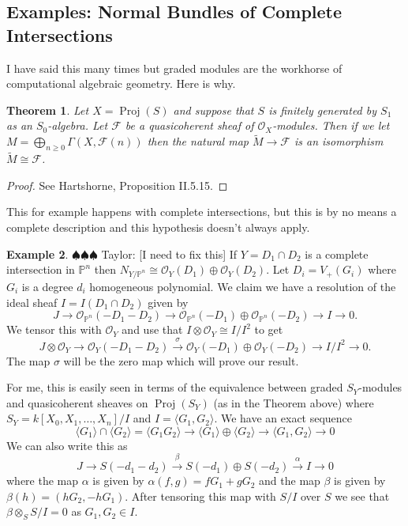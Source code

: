 \documentclass[12pt]{article}
\numberwithin{equation}{section}
\newtheorem{theorem}{Theorem}[subsection]
\theoremstyle{definition}
\newtheorem{example}[theorem]{Example}
\theoremstyle{remark}
\newcommand{\Ocal}{\mathcal{O}}
\newcommand{\PP}{\mathbb{P}}
\newcommand{\Proj}{\operatorname{Proj}}
\newcommand{\Fcal}{\mathcal{F}}
\newcommand{\taylor}[1]{{\color{blue} \sf $\spadesuit\spadesuit\spadesuit$ Taylor: [#1]}}
\begin{document}
\subsection{Examples: Normal Bundles of Complete Intersections}
I have said this many times but graded modules are the workhorse of computational algebraic geometry. 
Here is why. 
\begin{theorem}
	Let $X = \Proj(S)$ and suppose that $S$ is finitely generated by $S_1$ as an $S_0$-algebra. Let $\Fcal$ be a quasicoherent sheaf of $\Ocal_X$-modules. 
	Then if we let $M = \bigoplus_{n\geq 0} \Gamma(X,\Fcal(n))$ then the natural map $\widetilde{M} \to \Fcal$ is an isomorphism $\widetilde{M} \cong \Fcal$. 
\end{theorem}
\begin{proof}
	See Hartshorne, Proposition II.5.15.
\end{proof}

This for example happens with complete intersections, but this is by no means a complete description and this hypothesis doesn't always apply.

\begin{example}
	\taylor{I need to fix this}
	If $Y= D_1\cap D_2$ is a complete intersection in $\PP^n$ then $N_{Y/\PP^n} \cong \Ocal_{Y}(D_1)\oplus \Ocal_{Y}(D_2)$. 
	Let $D_i = V_+(G_i)$ where $G_i$ is a degree $d_i$ homogeneous polynomial.
	We claim we have a resolution of the ideal sheaf $I = I(D_1 \cap D_2)$ given by
	$$ J \to \Ocal_{\PP^n}(-D_1-D_2) \to \Ocal_{\PP^n}(-D_1) \oplus \Ocal_{\PP^n}(-D_2) \to I \to 0.$$
	We tensor this with $\Ocal_Y$ and use that $I\otimes \Ocal_Y \cong I/I^2$ to get
	$$ J \otimes \Ocal_Y \to \Ocal_Y(-D_1-D_2) \xrightarrow{\sigma} \Ocal_Y(-D_1)\oplus \Ocal_Y(-D_2) \to I/I^2 \to 0. $$
	The map $\sigma$ will be the zero map which will prove our result. 
	
	For me, this is easily seen in terms of the equivalence between graded $S_Y$-modules and quasicoherent sheaves on $\Proj(S_Y)$ (as in the Theorem above) where $S_Y = k[X_0,X_1,\ldots,X_n]/I$ and $I = \langle G_1,G_2 \rangle $.
	We have an exact sequence 
	$$ \langle G_1\rangle\cap \langle G_2 \rangle = \langle G_1G_2 \rangle \to \langle G_1 \rangle \oplus \langle G_2 \rangle  \to  \langle G_1,G_2 \rangle \to 0 $$
	We can also write this as 
	$$ J \to S(-d_1-d_2) \xrightarrow{\beta} S(-d_1)\oplus S(-d_2) \xrightarrow{\alpha} I \to 0 $$
	where the map $\alpha$ is given by $\alpha(f,g) = fG_1 + gG_2$ and the map $\beta$ is given by $\beta(h) = (hG_2,-hG_1)$. 
	After tensoring this map with $S/I$ over $S$ we see that $\beta\otimes_S S/I=0$ as $G_1, G_2 \in I$.
\end{example}
\end{document}
